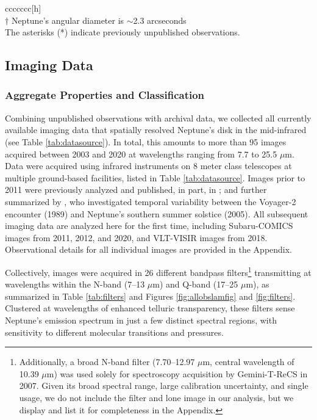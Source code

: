 \documentclass[twocolumn,10pt]{aastex631}
\begin{document}
\begin{deluxetable*}{ccccccc}[h]
{\\$\dagger$ Neptune's angular diameter is $\sim$2.3 arcseconds
\\The asterisks (*) indicate previously unpublished observations.}
\end{deluxetable*}


\subsection{Imaging Data} 
\subsubsection{Aggregate Properties and Classification}\label{sec:groupings}
Combining unpublished observations with archival data, we collected all currently available imaging data that spatially resolved Neptune's disk in the mid-infrared (see Table \ref{tab:datasource}). In total, this amounts to more than 95 images acquired between 2003 and 2020 at wavelengths ranging from 7.7 to 25.5 $\mu$m. Data were acquired using infrared instruments on 8 meter class telescopes at multiple ground-based facilities, listed in Table \ref{tab:datasource}.  Images prior to 2011 were previously analyzed and published, in part, in  \citet{hammel2007distribution,orton2007evidence,orton2012recovery,dePater2014neptune,sinclair2020spatial}; and further summarized by \citet{fletcher2014neptune}, who investigated temporal variability between the Voyager-2 encounter (1989) and Neptune's southern summer solstice (2005). All subsequent imaging data are analyzed here for the first time, including Subaru-COMICS images from 2011, 2012, and 2020, and VLT-VISIR images from 2018. Observational details for all individual images are provided in the Appendix.

Collectively, images were acquired in 26 different bandpass filters\footnote{Additionally, a broad N-band filter (7.70--12.97 $\mu$m, central wavelength of 10.39 $\mu$m) was used solely for spectroscopy acquisition by Gemini-T-ReCS in 2007. Given its broad spectral range, large calibration uncertainty, and single usage, we do not include the filter and lone image in our analysis, but we display and list it for completeness in the Appendix.} transmitting at wavelengths within the N-band (7--13 $\mu$m) and Q-band (17--25 $\mu$m), as summarized in Table \ref{tab:filters} and Figures \ref{fig:allobslamfig} and \ref{fig:filters}. Clustered at wavelengths of enhanced telluric transparency, these filters sense Neptune's emission spectrum in just a few distinct spectral regions, with sensitivity to different molecular transitions and pressures. 
\end{document}
